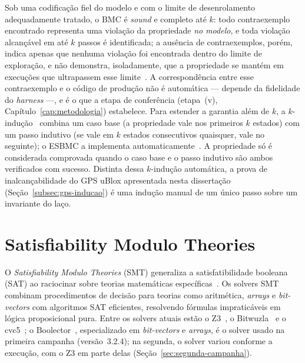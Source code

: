 Sob uma codificação fiel do modelo e com o limite de desenrolamento adequadamente
tratado, o BMC é \textit{sound} e completo até $k$: todo contraexemplo encontrado
representa uma violação da propriedade \emph{no modelo}, e toda violação alcançável
em até $k$ passos é identificada; a ausência de contraexemplos, porém, indica
apenas que nenhuma violação
foi encontrada dentro do limite de exploração, e não demonstra, isoladamente, que
a propriedade se mantém em execuções que ultrapassem esse limite~\cite{Biere1999}. A correspondência entre esse contraexemplo e o código de
produção não é automática --- depende da fidelidade do \textit{harness} ---, e é o
que a etapa de conferência (etapa~(v), Capítulo~\ref{cap:metodologia})
estabelece. Para estender a garantia além de $k$, a $k$-indução~\cite{Sheeran2000}
combina um caso base (a propriedade vale nos primeiros $k$ estados) com um passo
indutivo (se vale em $k$ estados consecutivos quaisquer, vale no seguinte); o
ESBMC a implementa automaticamente~\cite{Gadelha2017}. A propriedade só é
considerada comprovada quando o caso base e o passo indutivo são ambos verificados
com sucesso. %
Distinta dessa $k$-indução automática, a prova de inalcançabilidade do GPS uBlox apresentada nesta
dissertação (Seção~\ref{subsec:gps-inducao}) é uma indução manual de um único
passo sobre um invariante do laço.

\section{Satisfiability Modulo Theories}
\label{sec:smt}

O \textit{Satisfiability Modulo Theories} (SMT) generaliza a satisfatibilidade
booleana (SAT) ao raciocinar sobre teorias matemáticas
específicas~\cite{Barrett2018}. Os solvers SMT combinam procedimentos de decisão
para teorias como aritmética, \textit{arrays} e \textit{bit-vectors} com
algoritmos SAT eficientes, resolvendo fórmulas impraticáveis em lógica
proposicional pura. Entre os solvers atuais estão o Z3~\cite{deMoura2008}, o
Bitwuzla~\cite{Niemetz2023} e o cvc5~\cite{Barbosa2022}; o
Boolector~\cite{Brummayer2009}, especializado em \textit{bit-vectors} e
\textit{arrays}, é o solver usado na primeira campanha (versão~3.2.4); na segunda,
o solver variou conforme a execução, com o Z3 em parte delas (Seção~\ref{sec:segunda-campanha}).

